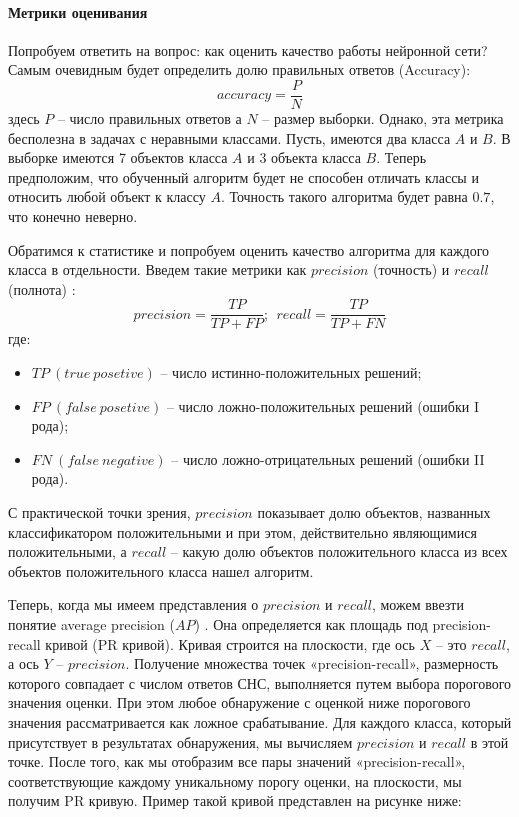 \paragraph{Метрики оценивания}

Попробуем ответить на вопрос: как оценить качество работы нейронной сети? Самым очевидным будет определить долю правильных ответов (Accuracy):
$$
accuracy = \frac{P}{N}
$$
здесь $P$ -- число правильных ответов а $N$ -- размер выборки. Однако, эта метрика бесполезна в задачах с неравными классами. Пусть, имеются два класса $A$ и $B$. В выборке имеются 7 объектов класса $A$ и 3 объекта класса $B$. Теперь предположим, что обученный алгоритм будет не способен отличать классы и относить любой объект к классу $A$. Точность такого алгоритма будет равна $0.7$, что конечно неверно.

Обратимся к статистике и попробуем оценить качество алгоритма для каждого класса в отдельности. Введем такие метрики как $precision$ (точность) и $recall$ (полнота) \cite{lib-ods-metrics}:
$$
precision = \frac{TP}{TP+FP};\ \ recall = \frac{TP}{TP+FN}
$$
где:
\begin{itemize}
    \item $TP\ (true\ posetive)$ -- число истинно-положительных решений;
    \item $FP\ (false\ posetive)$ -- число ложно-положительных решений (ошибки I рода);
    \item $FN\ (false\ negative)$ -- число ложно-отрицательных решений (ошибки II рода).
\end{itemize}

С практической точки зрения, $precision$ показывает долю объектов, названных классификатором положительными и при этом, действительно являющимися положительными, а $recall$ -- какую долю объектов положительного класса из всех объектов положительного класса нашел алгоритм.

Теперь, когда мы имеем представления о $precision$ и $recall$, можем ввезти понятие average precision ($AP$) \cite{lib-map-metric}. Она определяется как площадь под precision-recall кривой (PR кривой). Кривая строится на плоскости, где ось $X$ -- это $recall$, а ось $Y$ -- $precision$. Получение множества точек «precision-recall», размерность которого совпадает с числом ответов СНС, выполняется путем выбора порогового значения оценки. При этом любое обнаружение с оценкой ниже порогового значения рассматривается как ложное срабатывание. Для каждого класса, который присутствует в результатах обнаружения, мы вычисляем $precision$ и $recall$ в этой точке. После того, как мы отобразим все пары значений «precision-recall», соответствующие каждому уникальному порогу оценки, на плоскости, мы получим PR кривую. Пример такой кривой представлен на рисунке ниже:

